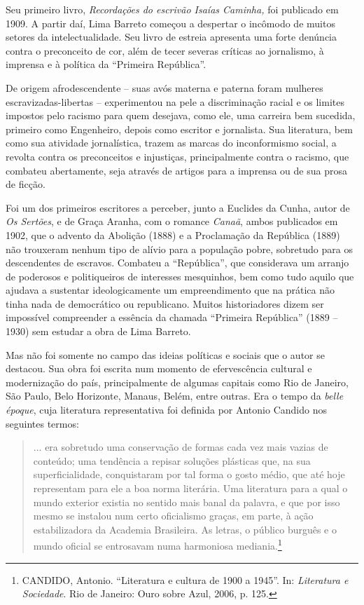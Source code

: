 Seu primeiro livro, \emph{Recordações do escrivão Isaías Caminha,} foi
publicado em 1909. A partir daí, Lima Barreto começou a despertar o
incômodo de muitos setores da intelectualidade. Seu livro de estreia
apresenta uma forte denúncia contra o preconceito de cor, além de tecer
severas críticas ao jornalismo, à imprensa e à política da ``Primeira
República''.

De origem afrodescendente -- suas avós materna e paterna foram mulheres
escravizadas-libertas -- experimentou na pele a discriminação racial e
os limites impostos pelo racismo para quem desejava, como ele, uma
carreira bem sucedida, primeiro como Engenheiro, depois como escritor e
jornalista. Sua literatura, bem como sua atividade jornalística, trazem
as marcas do inconformismo social, a revolta contra os preconceitos e
injustiças, principalmente contra o racismo, que combateu abertamente,
seja através de artigos para a imprensa ou de sua prosa de ficção.

Foi um dos primeiros escritores a perceber, junto a Euclides da Cunha,
autor de \emph{Os Sertões}, e de Graça Aranha, com o romance
\emph{Canaã}, ambos publicados em 1902, que o advento da Abolição (1888)
e a Proclamação da República (1889) não trouxeram nenhum tipo de alívio
para a população pobre, sobretudo para os descendentes de escravos.
Combateu a ``República'', que considerava um arranjo de poderosos e
politiqueiros de interesses mesquinhos, bem como tudo aquilo que ajudava
a sustentar ideologicamente um empreendimento que na prática não tinha
nada de democrático ou republicano. Muitos historiadores dizem ser
impossível compreender a essência da chamada ``Primeira República''
(1889 -- 1930) sem estudar a obra de Lima Barreto.

Mas não foi somente no campo das ideias políticas e sociais que o autor
se destacou. Sua obra foi escrita num momento de efervescência cultural
e modernização do país, principalmente de algumas capitais como Rio de
Janeiro, São Paulo, Belo Horizonte, Manaus, Belém, entre outras. Era o
tempo da \emph{belle époque}, cuja literatura representativa foi
definida por Antonio Candido nos seguintes termos:

\begin{quote}
... era sobretudo uma conservação de formas cada vez mais vazias de
conteúdo; uma tendência a repisar soluções plásticas que, na sua
superficialidade, conquistaram por tal forma o gosto médio, que até hoje
representam para ele a boa norma literária. Uma literatura para a qual o
mundo exterior existia no sentido mais banal da palavra, e que por isso
mesmo se instalou num certo oficialismo graças, em parte, à ação
estabilizadora da Academia Brasileira. As letras, o público burguês e o
mundo oficial se entrosavam numa harmoniosa mediania.\footnote{CANDIDO,
  Antonio. ``Literatura e cultura de 1900 a 1945''. In: \emph{Literatura
  e Sociedade}. Rio de Janeiro: Ouro sobre Azul, 2006, p. 125.}
\end{quote}

